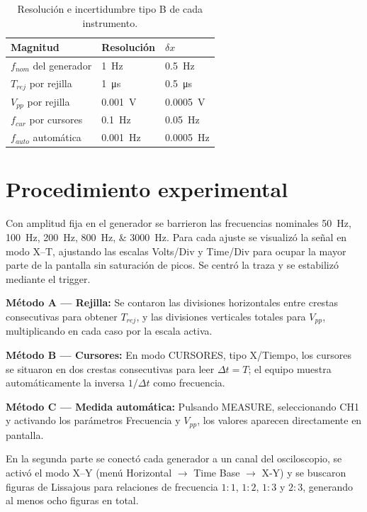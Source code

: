 \documentclass[12pt,a4paper]{article}
\begin{document}
\begin{multicols}{2}
\begin{table}[H]
\centering
\caption{Resolución e incertidumbre tipo B de cada instrumento.}
\label{tab:incertidumbres}
\small
\begin{tabularx}{\columnwidth}{>{\raggedright\arraybackslash}p{}YY}
\toprule
Magnitud & Resolución & $\delta x$ \\
\midrule
$f_{nom}$ del generador & \SI{1}{Hz} & \SI{0,5}{Hz} \\
$T_{rej}$ por rejilla & \SI{1}{\micro\second} & \SI{0,5}{\micro\second} \\
$V_{pp}$ por rejilla & \SI{0,001}{V} & \SI{0,0005}{V} \\
$f_{cur}$ por cursores & \SI{0,1}{Hz} & \SI{0,05}{Hz} \\
$f_{auto}$ automática & \SI{0,001}{Hz} & \SI{0,0005}{Hz} \\
\bottomrule
\end{tabularx}
\end{table}

\section{Procedimiento experimental}

Con amplitud fija en el generador se barrieron las frecuencias nominales \SIlist{50;100;200;800;3000}{\hertz}. Para cada ajuste se visualizó la señal en modo X--T, ajustando las escalas Volts/Div y Time/Div para ocupar la mayor parte de la pantalla sin saturación de picos. Se centró la traza y se estabilizó mediante el trigger.

\textbf{Método A --- Rejilla:} Se contaron las divisiones horizontales entre crestas consecutivas para obtener $T_{rej}$, y las divisiones verticales totales para $V_{pp}$, multiplicando en cada caso por la escala activa.

\textbf{Método B --- Cursores:} En modo CURSORES, tipo X/Tiempo, los cursores se situaron en dos crestas consecutivas para leer $\Delta t = T$; el equipo muestra automáticamente la inversa $1/\Delta t$ como frecuencia.

\textbf{Método C --- Medida automática:} Pulsando MEASURE, seleccionando CH1 y activando los parámetros Frecuencia y $V_{pp}$, los valores aparecen directamente en pantalla.

En la segunda parte se conectó cada generador a un canal del osciloscopio, se activó el modo X--Y (menú Horizontal $\to$ Time Base $\to$ X-Y) y se buscaron figuras de Lissajous para relaciones de frecuencia $1{:}1$, $1{:}2$, $1{:}3$ y $2{:}3$, generando al menos ocho figuras en total.

\end{multicols}
\end{document}
